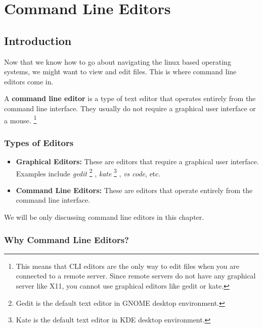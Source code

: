 \chapter{Command Line Editors}

\section{Introduction}

Now that we know how to go about navigating the linux based operating systems, we might want to view and edit files.
This is where command line editors come in.

\begin{definition}
A \textbf{command line editor} is a type of text editor that operates entirely from the command line interface.
They usually do not require a graphical user interface or a mouse.
\footnote{
  This means that CLI editors are the only way to edit files when you are connected to a remote server.
  Since remote servers do not have any graphical server like X11, you cannot use graphical editors like gedit or kate.
}
\end{definition}

\subsection{Types of Editors}

\begin{itemize}

\item \textbf{Graphical Editors:} These are editors that require a graphical user interface.
  Examples include \textit{gedit}
  \footnote{
    Gedit is the default text editor in GNOME desktop environment.
  }
  , \textit{kate}
  \footnote{
    Kate is the default text editor in KDE desktop environment.
  }
  , \textit{vs code}, etc.

\item \textbf{Command Line Editors:} These are editors that operate entirely from the command line interface.

\end{itemize}

We will be only discussing command line editors in this chapter.

\subsection{Why Command Line Editors?}

